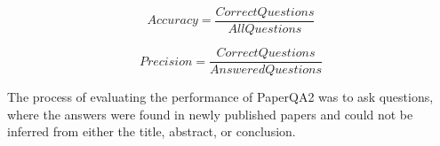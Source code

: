 \begin{equation}
    Accuracy = \frac{Correct Questions}{All Questions}
\end{equation}


\begin{equation}
    Precision = \frac{Correct Questions}{Answered Questions}
\end{equation}

The process of evaluating the performance of PaperQA2 was to ask questions, where the answers were found in newly published papers and could not be inferred from either the title, abstract, or conclusion. \\

